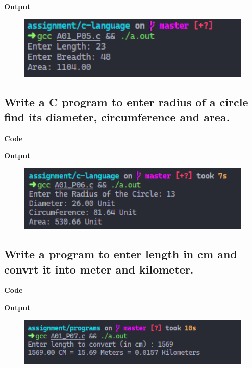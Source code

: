 \documentclass[a4paper]{article}
\begin{document}


\textbf{Output}

\begin{figure}[h]
  \includegraphics[width=12cm]{A01_P05}
\end{figure}

\newpage



\subsection{Write a C program to enter radius of a circle find its diameter, circumference and area.}
\textbf{Code}



\textbf{Output}

\begin{figure}[h]
  \includegraphics[width=12cm]{A01_P06}
\end{figure}

\newpage



\subsection{Write a program to enter length in cm and convrt it into meter and kilometer.}
\textbf{Code}



\textbf{Output}

\begin{figure}[h]
  \includegraphics[width=12cm]{A01_P07}
\end{figure}
\end{document}
